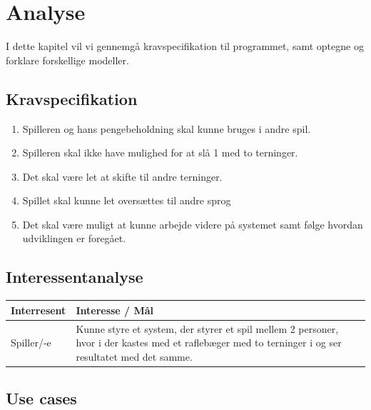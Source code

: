 \chapter{Analyse}

I dette kapitel vil vi gennemgå kravspecifikation til programmet, samt optegne og forklare forskellige modeller.


\section{Kravspecifikation}

\begin{enumerate}
    \item Spilleren og hans pengebeholdning skal kunne bruges i andre spil.
    \item Spilleren skal ikke have mulighed for at slå 1 med to terninger.
    \item Det skal være let at skifte til andre terninger.
    \item Spillet skal kunne let oversættes til andre sprog
    \item Det skal være muligt at kunne arbejde videre på systemet samt følge hvordan
    udviklingen er foregået.
\end{enumerate}

\section{Interessentanalyse}

\begin{center}
    \begin{tabular}{ | l | p{13cm} |}
    \hline
    \textbf{Interresent} & \textbf{Interesse / Mål} \\ \hline
    Spiller/-e & Kunne styre et system, der styrer et spil mellem 2 personer, 
    hvor i der kastes med et raflebæger med to terninger i og ser resultatet med det samme.\\ \hline
    \hline
    \end{tabular}
\end{center}

\section{Use cases}

